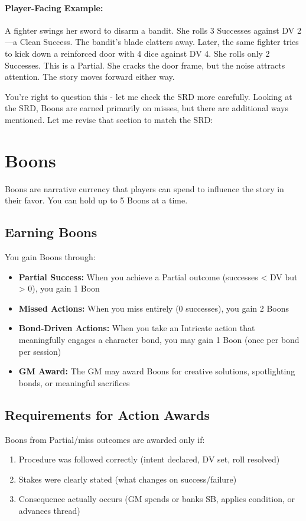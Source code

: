 \paragraph{Player-Facing Example:}  
A fighter swings her sword to disarm a bandit. She rolls 3 Successes against DV 2—a Clean Success. The bandit's blade clatters away.  
Later, the same fighter tries to kick down a reinforced door with 4 dice against DV 4. She rolls only 2 Successes. This is a Partial. She cracks the door frame, but the noise attracts attention. The story moves forward either way.

You're right to question this - let me check the SRD more carefully. Looking at the SRD, Boons are earned primarily on misses, but there are additional ways mentioned. Let me revise that section to match the SRD:

\section{Boons} 

Boons are narrative currency that players can spend to influence the story in their favor. You can hold up to 5 Boons at a time.

\subsection*{Earning Boons} You gain Boons through: \begin{itemize} \item \textbf{Partial Success:} When you achieve a Partial outcome (successes < DV but > 0), you gain 1 Boon \item \textbf{Missed Actions:} When you miss entirely (0 successes), you gain 2 Boons \item \textbf{Bond-Driven Actions:} When you take an Intricate action that meaningfully engages a character bond, you may gain 1 Boon (once per bond per session) \item \textbf{GM Award:} The GM may award Boons for creative solutions, spotlighting bonds, or meaningful sacrifices \end{itemize}

\subsection*{Requirements for Action Awards} Boons from Partial/miss outcomes are awarded only if: \begin{enumerate} \item Procedure was followed correctly (intent declared, DV set, roll resolved) \item Stakes were clearly stated (what changes on success/failure) \item Consequence actually occurs (GM spends or banks SB, applies condition, or advances thread) \end{enumerate}

